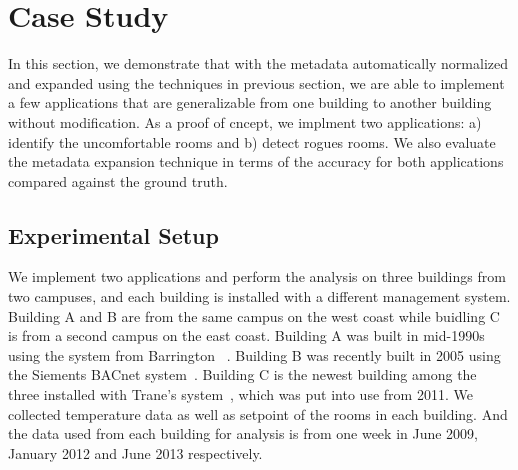 \section{Case Study}
In this section, we demonstrate that with the metadata automatically normalized and expanded using the techniques in previous section, we are able to implement a few applications that are generalizable from one building to another building without modification. As a proof of cncept, we implment two applications: a) identify the uncomfortable rooms and b) detect rogues rooms. We also evaluate the metadata expansion technique in terms of the accuracy for both applications compared against the ground truth. 

\subsection{Experimental Setup}
We implement two applications and perform the analysis on three buildings from two campuses, and each building is installed with a different management system. Building A and B are from the same campus on the west coast while buidling C is from a second campus on the east coast. Building A was built in mid-1990s using the system from Barrington ~\cite{}. Building B was recently built in 2005 using the Siements BACnet system~\cite{}. Building C is the newest building among the three installed with Trane's system~\cite{}, which was put into use from 2011. We collected temperature data as well as setpoint of the rooms in each building. And the data used from each building for analysis is from one week in June 2009, January 2012 and June 2013 respectively.

